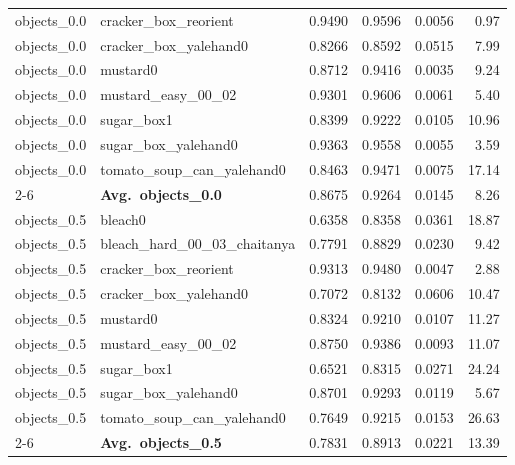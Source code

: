 \begin{longtable}{llrrrr}
  objects_0.0 & cracker\_box\_reorient & 0.9490 & 0.9596 & 0.0056 & 0.97 \\
  objects_0.0 & cracker\_box\_yalehand0 & 0.8266 & 0.8592 & 0.0515 & 7.99 \\
  objects_0.0 & mustard0 & 0.8712 & 0.9416 & 0.0035 & 9.24 \\
  objects_0.0 & mustard\_easy\_00\_02 & 0.9301 & 0.9606 & 0.0061 & 5.40 \\
  objects_0.0 & sugar\_box1 & 0.8399 & 0.9222 & 0.0105 & 10.96 \\
  objects_0.0 & sugar\_box\_yalehand0 & 0.9363 & 0.9558 & 0.0055 & 3.59 \\
  objects_0.0 & tomato\_soup\_can\_yalehand0 & 0.8463 & 0.9471 & 0.0075 & 17.14 \\
  \cmidrule{2-6}
  & \textbf{Avg.~objects_0.0} & 0.8675 & 0.9264 & 0.0145 & 8.26 \\
  \midrule
  objects_0.5 & bleach0 & 0.6358 & 0.8358 & 0.0361 & 18.87 \\
  objects_0.5 & bleach\_hard\_00\_03\_chaitanya & 0.7791 & 0.8829 & 0.0230 & 9.42 \\
  objects_0.5 & cracker\_box\_reorient & 0.9313 & 0.9480 & 0.0047 & 2.88 \\
  objects_0.5 & cracker\_box\_yalehand0 & 0.7072 & 0.8132 & 0.0606 & 10.47 \\
  objects_0.5 & mustard0 & 0.8324 & 0.9210 & 0.0107 & 11.27 \\
  objects_0.5 & mustard\_easy\_00\_02 & 0.8750 & 0.9386 & 0.0093 & 11.07 \\
  objects_0.5 & sugar\_box1 & 0.6521 & 0.8315 & 0.0271 & 24.24 \\
  objects_0.5 & sugar\_box\_yalehand0 & 0.8701 & 0.9293 & 0.0119 & 5.67 \\
  objects_0.5 & tomato\_soup\_can\_yalehand0 & 0.7649 & 0.9215 & 0.0153 & 26.63 \\
  \cmidrule{2-6}
  & \textbf{Avg.~objects_0.5} & 0.7831 & 0.8913 & 0.0221 & 13.39 \\
  \midrule
\bottomrule
\end{longtable}